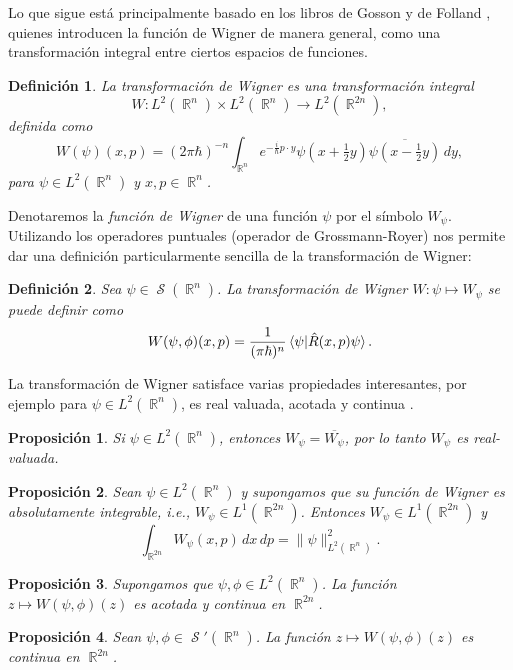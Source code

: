 \documentclass[a4paper]{report}
\DeclareMathOperator{\R}{\mathbb{R}}
\DeclareMathOperator{\Sz}{\mathcal S}
\newtheorem{definition}{Definición}
\newtheorem{proposition}{Proposición}
\begin{document}
  Lo que sigue está principalmente basado en los libros de
  Gosson \cite{gosson2017} y de Folland \cite{folland1989},
  quienes introducen la función de Wigner de manera general,
  como una transformación integral entre ciertos espacios de
  funciones. 
  \begin{definition}
    La transformación de Wigner es una transformación
    integral
    \begin{equation}
      W : L^2(\R^{n}) \times L^2(\R^{n}) \to L^2(\R^{2n}),
    \end{equation}
    definida como
    \begin{equation}
      \label{eqn:cross_wigner_transform}
      W(\psi)(x,p)
      = (2\pi\hbar)^{-n} \int_{\R^{n}} e^{-\frac{i}{\hbar} p
      \cdot y} \psi(x + \tfrac{1}{2}y) \overline{\psi(x -
      \tfrac{1}{2}y)} \, dy,
    \end{equation}
    para $\psi \in L^2(\R^{n})$ y $x,p \in \R^{n}$.  
  \end{definition} 
  Denotaremos la \textit{función de Wigner} de una función
  $\psi$ por el símbolo $W_\psi$. Utilizando los operadores
  puntuales (operador de Grossmann-Royer) nos permite dar
  una definición particularmente sencilla de la
  transformación de Wigner:
  \begin{definition}
    Sea $\psi \in \Sz(\R^{n})$. La transformación de Wigner
    $W : \psi \mapsto W_\psi$ se puede definir como
    \begin{equation}
      W(\psi,\phi)(x,p)
      = \frac{1}{(\pi\hbar)^{n}} \braket{\psi|
      \hat{R}(x,p)\psi}.
    \end{equation}
  \end{definition}
  La transformación de Wigner satisface varias propiedades
  interesantes, por ejemplo para $\psi \in L^2(\R^{n})$, es
  real valuada, acotada y continua \cite{degosson2016}.
  \begin{proposition}
    Si $\psi \in L^2(\R^{n})$, entonces $W_\psi =
    \overline{W_\psi}$, por lo tanto $W_\psi$ es
    real-valuada. 
  \end{proposition}
  \begin{proposition}
    Sean $\psi \in L^2(\R^{n})$ y supongamos que su función
    de Wigner es absolutamente integrable, i.e., $W_\psi \in
    L^{1}(\R^{2n})$. Entonces $W_\psi \in L^{1}(\R^{2n})$ y
    \begin{equation}
      \int_{\R^{2n}} W_\psi(x,p) \, dx \, dp 
      = \|\psi\|^2_{L^2(\R^{n})}.
    \end{equation}
  \end{proposition}
  \begin{proposition}
    Supongamos que $\psi, \phi \in L^2(\R^{n})$. La función
    $z \mapsto W(\psi,\phi)(z)$ es acotada y continua en
    $\R^{2n}$.
  \end{proposition}
  \begin{proposition}
    Sean $\psi,\phi \in \Sz'(\R^{n})$. La función $z
    \mapsto W(\psi,\phi)(z)$ es continua en $\R^{2n}$.
  \end{proposition}
\end{document}
